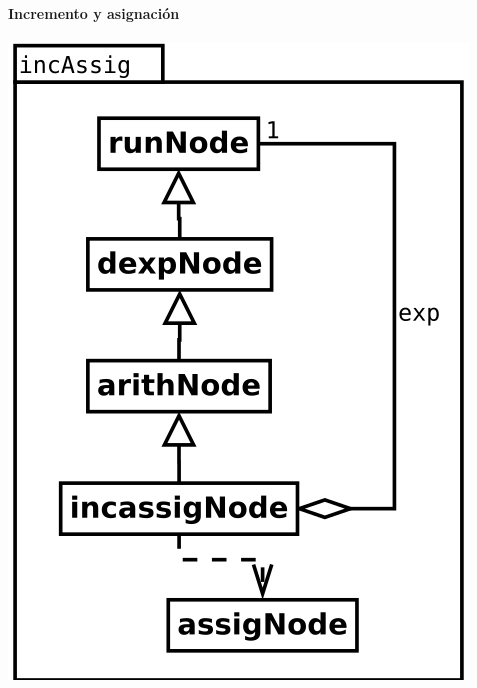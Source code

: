 \paragraph {Incremento y asignación}
\begin{center}
\includegraphics[scale=0.4]{incAssig.png} \\
\end{center}

